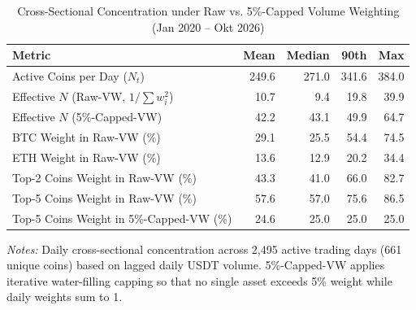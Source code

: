 \begin{table}[htbp]
\centering
\caption{Cross-Sectional Concentration under Raw vs. 5\%-Capped Volume Weighting (Jan 2020 -- Okt 2026)}
\label{tab:weight_concentration}
\begin{tabular}{lrrrr}
\toprule
Metric & Mean & Median & 90th & Max \\
\midrule
Active Coins per Day ($N_t$) & 249.6 & 271.0 & 341.6 & 384.0 \\
Effective $N$ (Raw-VW, $1/\sum w_i^2$) & 10.7 & 9.4 & 19.8 & 39.9 \\
Effective $N$ (5\%-Capped-VW) & 42.2 & 43.1 & 49.9 & 64.7 \\
BTC Weight in Raw-VW (\%) & 29.1 & 25.5 & 54.4 & 74.5 \\
ETH Weight in Raw-VW (\%) & 13.6 & 12.9 & 20.2 & 34.4 \\
Top-2 Coins Weight in Raw-VW (\%) & 43.3 & 41.0 & 66.0 & 82.7 \\
Top-5 Coins Weight in Raw-VW (\%) & 57.6 & 57.0 & 75.6 & 86.5 \\
Top-5 Coins Weight in 5\%-Capped-VW (\%) & 24.6 & 25.0 & 25.0 & 25.0 \\
\bottomrule
\end{tabular}
\vspace{0.3em}
\footnotesize{\textit{Notes:} Daily cross-sectional concentration across 2,495 active trading days (661 unique coins) based on lagged daily USDT volume. 5\%-Capped-VW applies iterative water-filling capping so that no single asset exceeds 5\% weight while daily weights sum to 1.}
\end{table}
